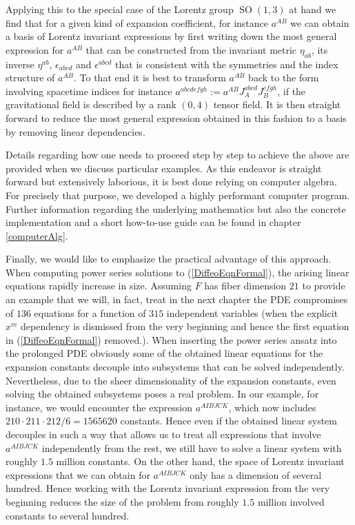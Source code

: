 Applying this to the special case of the Lorentz group $\operatorname{SO}(1,3)$ at hand we find that for a given kind of expansion coefficient, for instance $a^{AB}$ we can obtain a basis of Lorentz invariant expressions by first writing down the most general expression for $a^{AB}$ that can be constructed from the invariant metric $\eta_{ab}$, its inverse $\eta^{ab}$, $\epsilon_{abcd}$ and $\epsilon^{abcd}$ that is consistent with the symmetries and the index structure of $a^{AB}$. To that end it is best to transform $a^{AB}$ back to the form involving spacetime indices for instance $a^{abcdefgh} := a^{AB}J_A^{abcd}J_B^{efgh}$, if the gravitational field is described by a rank $(0,4)$ tensor field. It is then straight forward to reduce the most general expression obtained in this fashion to a basis by removing linear dependencies.

Details regarding how one needs to proceed step by step to achieve the above are provided when we discuss particular examples. As this endeavor is straight forward but extensively laborious, it is best done relying on computer algebra. For precisely that purpose, we developed a highly performant computer program. 
Further information regarding the underlying mathematics but also the concrete implementation and a short how-to-use guide can be found in chapter \ref{computerAlg}. 

Finally, we would like to emphasize the practical advantage of this approach. When computing power series solutions to (\ref{DiffeoEqnFormal}), the arising linear equations rapidly increase in size. Assuming $F$ has fiber dimension $21$ to provide an example that we will, in fact, treat in the next chapter the PDE compromises of $136$ equations for a function of $315$ independent variables (when the explicit $x^m$ dependency is dismissed from the very beginning and hence the first equation in (\ref{DiffeoEqnFormal}) removed.).  When inserting the power series ansatz into the prolonged PDE obviously some of the obtained linear equations for the expansion constants decouple into subsystems that can be solved independently. Nevertheless, due to the sheer dimensionality of the expansion constants, even solving the obtained subsystems poses a real problem. In our example, for instance, we would encounter the expression $a^{AIBJCK}$, which now includes $210\cdot 211\cdot212/6=1565620$ constants. Hence even if the obtained linear system decouples in such a way that allows us to treat all expressions that involve $a^{AIBJCK}$ independently from the rest, we still have to solve a linear system with roughly $1.5$ million constants. On the other hand, the space of Lorentz invariant expressions that we can obtain for $a^{AIBJCK}$ only has a dimension of several hundred. Hence working with the Lorentz invariant expression from the very beginning reduces the size of the problem from roughly $1.5$ million involved constants to several hundred. 

